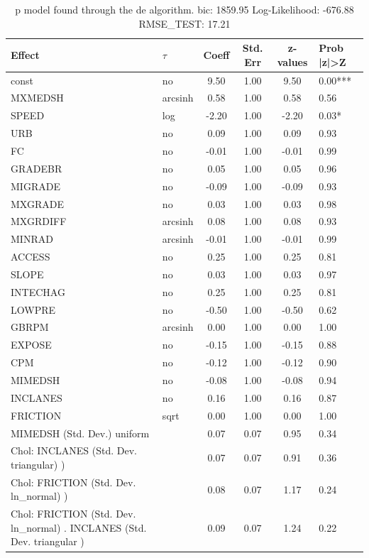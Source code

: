 \begin{table}
	\caption{p model found through the de algorithm. bic: 1859.95 Log-Likelihood: -676.88 RMSE_TEST: 17.21}
	\begin{center}
		\begin{tabular}{|l|l|c|c|c|l|}
			\hline
			Effect & $\tau$ & Coeff & Std. Err & z-values & Prob |z|>Z \\
			\hline
			const & no & 9.50 & 1.00 & 9.50 & 0.00*** \\
			\hline
			MXMEDSH & arcsinh & 0.58 & 1.00 & 0.58 & 0.56 \\
			\hline
			SPEED & log & -2.20 & 1.00 & -2.20 & 0.03* \\
			\hline
			URB & no & 0.09 & 1.00 & 0.09 & 0.93 \\
			\hline
			FC & no & -0.01 & 1.00 & -0.01 & 0.99 \\
			\hline
			GRADEBR & no & 0.05 & 1.00 & 0.05 & 0.96 \\
			\hline
			MIGRADE & no & -0.09 & 1.00 & -0.09 & 0.93 \\
			\hline
			MXGRADE & no & 0.03 & 1.00 & 0.03 & 0.98 \\
			\hline
			MXGRDIFF & arcsinh & 0.08 & 1.00 & 0.08 & 0.93 \\
			\hline
			MINRAD & arcsinh & -0.01 & 1.00 & -0.01 & 0.99 \\
			\hline
			ACCESS & no & 0.25 & 1.00 & 0.25 & 0.81 \\
			\hline
			SLOPE & no & 0.03 & 1.00 & 0.03 & 0.97 \\
			\hline
			INTECHAG & no & 0.25 & 1.00 & 0.25 & 0.81 \\
			\hline
			LOWPRE & no & -0.50 & 1.00 & -0.50 & 0.62 \\
			\hline
			GBRPM & arcsinh & 0.00 & 1.00 & 0.00 & 1.00 \\
			\hline
			EXPOSE & no & -0.15 & 1.00 & -0.15 & 0.88 \\
			\hline
			CPM & no & -0.12 & 1.00 & -0.12 & 0.90 \\
			\hline
			MIMEDSH & no & -0.08 & 1.00 & -0.08 & 0.94 \\
			\hline
			INCLANES & no & 0.16 & 1.00 & 0.16 & 0.87 \\
			\hline
			FRICTION & sqrt & 0.00 & 1.00 & 0.00 & 1.00 \\
			\hline
			MIMEDSH (Std. Dev.) uniform &  & 0.07 & 0.07 & 0.95 & 0.34 \\
			\hline
			 Chol: INCLANES (Std. Dev. triangular) ) &  & 0.07 & 0.07 & 0.91 & 0.36 \\
			\hline
			 Chol: FRICTION (Std. Dev. ln_normal) ) &  & 0.08 & 0.07 & 1.17 & 0.24 \\
			\hline
			 Chol: FRICTION (Std. Dev. ln_normal) . INCLANES (Std. Dev.   triangular ) &  & 0.09 & 0.07 & 1.24 & 0.22 \\
			\hline
		\end{tabular}
	\end{center}
\end{table}